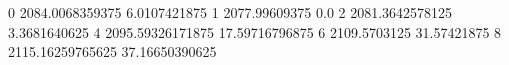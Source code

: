 0 2084.0068359375 6.0107421875
1 2077.99609375 0.0
2 2081.3642578125 3.3681640625
4 2095.59326171875 17.59716796875
6 2109.5703125 31.57421875
8 2115.16259765625 37.16650390625
